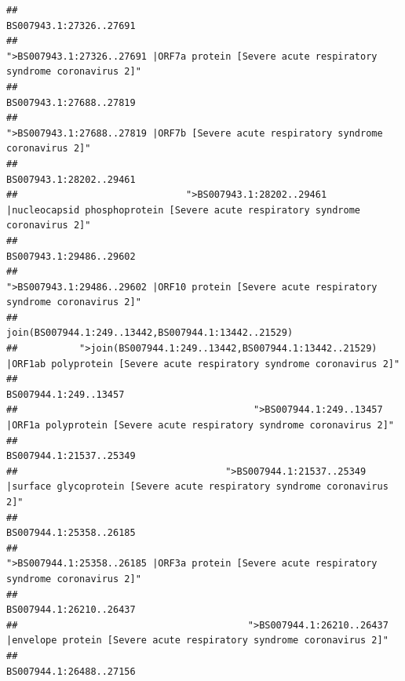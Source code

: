 \documentclass[
]{article}
\begin{document}
\begin{verbatim}
##                                                                                                                BS007943.1:27326..27691 
##                                            ">BS007943.1:27326..27691 |ORF7a protein [Severe acute respiratory syndrome coronavirus 2]" 
##                                                                                                                BS007943.1:27688..27819 
##                                                    ">BS007943.1:27688..27819 |ORF7b [Severe acute respiratory syndrome coronavirus 2]" 
##                                                                                                                BS007943.1:28202..29461 
##                              ">BS007943.1:28202..29461 |nucleocapsid phosphoprotein [Severe acute respiratory syndrome coronavirus 2]" 
##                                                                                                                BS007943.1:29486..29602 
##                                            ">BS007943.1:29486..29602 |ORF10 protein [Severe acute respiratory syndrome coronavirus 2]" 
##                                                                                    join(BS007944.1:249..13442,BS007944.1:13442..21529) 
##           ">join(BS007944.1:249..13442,BS007944.1:13442..21529) |ORF1ab polyprotein [Severe acute respiratory syndrome coronavirus 2]" 
##                                                                                                                  BS007944.1:249..13457 
##                                          ">BS007944.1:249..13457 |ORF1a polyprotein [Severe acute respiratory syndrome coronavirus 2]" 
##                                                                                                                BS007944.1:21537..25349 
##                                     ">BS007944.1:21537..25349 |surface glycoprotein [Severe acute respiratory syndrome coronavirus 2]" 
##                                                                                                                BS007944.1:25358..26185 
##                                            ">BS007944.1:25358..26185 |ORF3a protein [Severe acute respiratory syndrome coronavirus 2]" 
##                                                                                                                BS007944.1:26210..26437 
##                                         ">BS007944.1:26210..26437 |envelope protein [Severe acute respiratory syndrome coronavirus 2]" 
##                                                                                                                BS007944.1:26488..27156 

\end{verbatim}
\end{document}
